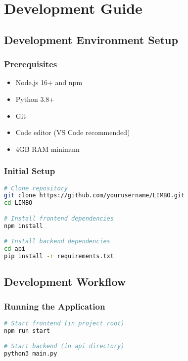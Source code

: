 \chapter{Development Guide}

\section{Development Environment Setup}

\subsection{Prerequisites}
\begin{itemize}
    \item Node.js 16+ and npm
    \item Python 3.8+
    \item Git
    \item Code editor (VS Code recommended)
    \item 4GB RAM minimum
\end{itemize}

\subsection{Initial Setup}
\begin{tcolorbox}[title=Clone and Setup]
\begin{lstlisting}[language=bash]
# Clone repository
git clone https://github.com/yourusername/LIMBO.git
cd LIMBO

# Install frontend dependencies
npm install

# Install backend dependencies
cd api
pip install -r requirements.txt
\end{lstlisting}
\end{tcolorbox}

\section{Development Workflow}
\subsection{Running the Application}
\begin{tcolorbox}[title=Start Development Servers]
\begin{lstlisting}[language=bash]
# Start frontend (in project root)
npm run start

# Start backend (in api directory)
python3 main.py
\end{lstlisting}
\end{tcolorbox}

